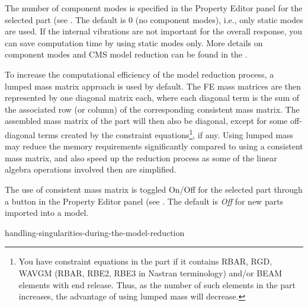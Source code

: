 The number of component modes is specified in the Property Editor panel
for the selected part (see
.
The default is 0 (no component modes), i.e., only static modes are used.
If the internal vibrations are not important for the overall response,
you can save computation time by using static modes only.
More details on component modes and CMS model reduction can be found in the
.



To increase the computational efficiency of the model reduction process,
a lumped mass matrix approach is used by default. The FE mass matrices are then
represented by one diagonal matrix each, where each diagonal term is the sum of
the associated row (or column) of the corresponding consistent mass matrix.
The assembled mass matrix of the part will then also be diagonal, except for
some off-diagonal terms created by the constraint equations\footnote{
You have constraint equations in the part if it contains RBAR, RGD, WAVGM
(RBAR, RBE2, RBE3 in Nastran terminology) and/or BEAM elements with end release.
Thus, as the number of such elements in the part increases, the advantage of
using lumped mass will decrease.}, if any.
Using lumped mass may reduce the memory requirements significantly compared to
using a consistent mass matrix, and also speed up the reduction process as some
of the linear algebra operations involved then are simplified.


The use of consistent mass matrix is toggled On/Off for the selected part
through a button in the Property Editor panel (see
.
The default is {\sl Off} for new parts imported into a model.


           {handling-singularities-during-the-model-reduction}

